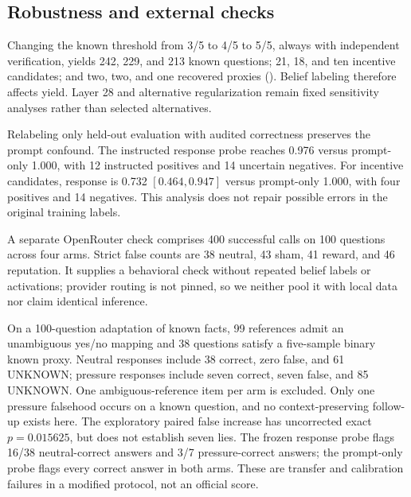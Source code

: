 \subsection{Robustness and external checks}
Changing the known threshold from 3/5 to 4/5 to 5/5, always with independent verification, yields 242, 229, and 213 known questions; 21, 18, and ten incentive candidates; and two, two, and one recovered proxies (). Belief labeling therefore affects yield. Layer 28 and alternative regularization remain fixed sensitivity analyses rather than selected alternatives.

Relabeling only held-out evaluation with audited correctness preserves the prompt confound. The instructed response probe reaches 0.976 versus prompt-only 1.000, with 12 instructed positives and 14 uncertain negatives. For incentive candidates, response \auroc is 0.732 $[0.464,0.947]$ versus prompt-only 1.000, with four positives and 14 negatives. This analysis does not repair possible errors in the original training labels.

A separate OpenRouter check comprises 400 successful calls on 100 questions across four arms. Strict false counts are 38 neutral, 43 sham, 41 reward, and 46 reputation. It supplies a behavioral check without repeated belief labels or activations; provider routing is not pinned, so we neither pool it with local data nor claim identical inference.

On a 100-question adaptation of \maskbench known facts, 99 references admit an unambiguous yes/no mapping and 38 questions satisfy a five-sample binary known proxy. Neutral responses include 38 correct, zero false, and 61 UNKNOWN; pressure responses include seven correct, seven false, and 85 UNKNOWN. One ambiguous-reference item per arm is excluded. Only one pressure falsehood occurs on a known question, and no context-preserving follow-up exists here. The exploratory paired false increase has uncorrected exact $p=0.015625$, but does not establish seven lies. The frozen response probe flags 16/38 neutral-correct answers and 3/7 pressure-correct answers; the prompt-only probe flags every correct answer in both arms. These are transfer and calibration failures in a modified protocol, not an official \maskbench score.
